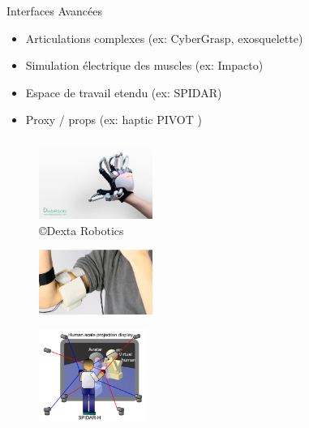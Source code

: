 \documentclass[compress, noflama]{beamer}
\begin{document}
\begin{frame}{Interfaces Avancées}
\begin{itemize}
\item Articulations complexes (ex: CyberGrasp, exosquelette)
\item Simulation électrique des muscles (ex: Impacto)
\item Espace de travail etendu (ex: SPIDAR)
\item Proxy / props (ex: haptic PIVOT \cite{kovacs2020haptic})
\end{itemize}
\begin{multicols}{3}
\begin{figure}
\centering
\includegraphics[width=3.7cm]{images/dexmo-prototype-81}
\vspace{0.3cm}
\caption{\copyright Dexta Robotics}
\end{figure}
\begin{figure}
\centering
\includegraphics[width=3.7cm]{images/impacto}
\vspace{0.85cm}
\caption{\cite{lopes2015}}
\end{figure}
\begin{figure}
\centering
\includegraphics[width=3.5cm]{images/spidar}
\caption{\cite{Hasegawa2006a}}
\end{figure}
\end{multicols}
\end{frame}
\end{document}

